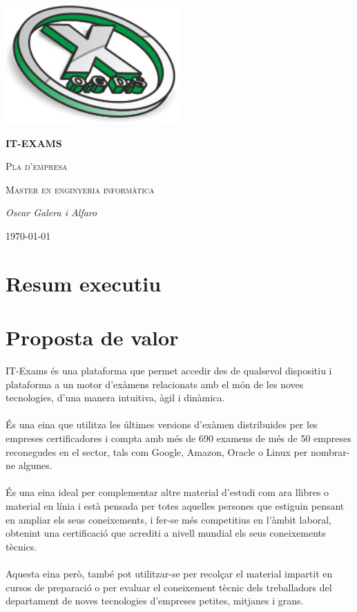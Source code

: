 \documentclass[12pt]{article}
\begin{document}
\begin{titlepage}
		\centering
		\includegraphics[width=0.5\textwidth]{imatges/icon.png}\par\vspace{1cm}
		{\huge\bfseries IT-EXAMS\par}
		\vspace{1cm}
		{\scshape\Large Pla d'empresa\par}
		\vspace{1cm}
		{\scshape\Large Master en enginyeria informàtica\par}
		\vspace{1.5cm}
		{\Large\itshape Oscar Galera i Alfaro\par}
		\vfill
		{\large \today\par}
\end{titlepage}
\tableofcontents

\clearpage
\section{Resum executiu}
\clearpage
\section{Proposta de valor}
IT-Exams és una plataforma que permet accedir des de qualsevol dispositiu i plataforma a un motor d'exàmens relacionats amb el món de les noves tecnologies, d'una manera intuitiva, àgil i dinàmica. 
\\\\És una eina que utilitza les últimes versions d'exàmen distribuides per les empreses certificadores i compta amb més de 690 examens de més de 50 empreses reconegudes en el sector, tals com Google, Amazon, Oracle o Linux per nombrar-ne algunes. 
\\\\És una eina ideal per complementar altre material d'estudi com ara llibres o material en línia i està pensada per totes aquelles persones que estiguin pensant en ampliar els seus coneixements, i fer-se més competitius en l'àmbit laboral, obtenint una certificació que acrediti a nivell mundial els seus coneixements tècnics. 
\\\\Aquesta eina però, també pot utilitzar-se per recolçar el material impartit en cursos de preparació o per evaluar el coneixement tècnic dels treballadors del departament de noves tecnologies d'empreses petites, mitjanes i grans.
\clearpage
\end{document}
